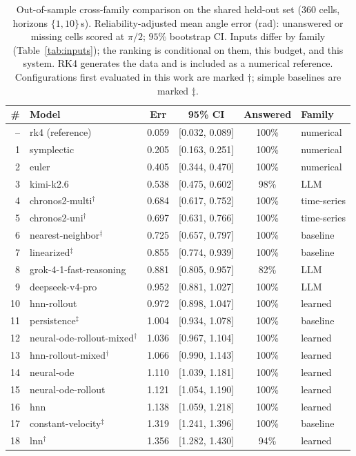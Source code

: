 \documentclass{article}
\begin{document}
\begin{table}[tbp]
\centering\footnotesize\renewcommand{\arraystretch}{0.82}
\caption{Out-of-sample cross-family comparison on the shared held-out set ($360$ cells, horizons
$\{1,10\}$\,s). Reliability-adjusted mean angle error (rad): unanswered or missing cells
scored at $\pi/2$; $95\%$ bootstrap CI. Inputs differ by family (Table~\ref{tab:inputs}); the
ranking is conditional on them, this budget, and this system. RK4 generates the data and is
included as a numerical reference. Configurations first evaluated in this work are marked $\dagger$;
simple baselines are marked $\ddagger$.}\label{tab:overall}
\begin{tabular}{rlcccl}
\toprule
\# & Model & Err & 95\% CI & Answered & Family \\
\midrule
-- & rk4 (reference) & 0.059 & [0.032, 0.089] & 100\% & numerical \\
1 & symplectic & 0.205 & [0.163, 0.251] & 100\% & numerical \\
2 & euler & 0.405 & [0.344, 0.470] & 100\% & numerical \\
3 & kimi-k2.6 & 0.538 & [0.475, 0.602] & 98\% & LLM \\
4 & chronos2-multi$^\dagger$ & 0.684 & [0.617, 0.752] & 100\% & time-series \\
5 & chronos2-uni$^\dagger$ & 0.697 & [0.631, 0.766] & 100\% & time-series \\
6 & nearest-neighbor$^\ddagger$ & 0.725 & [0.657, 0.797] & 100\% & baseline \\
7 & linearized$^\ddagger$ & 0.855 & [0.774, 0.939] & 100\% & baseline \\
8 & grok-4-1-fast-reasoning & 0.881 & [0.805, 0.957] & 82\% & LLM \\
9 & deepseek-v4-pro & 0.952 & [0.881, 1.027] & 100\% & LLM \\
10 & hnn-rollout & 0.972 & [0.898, 1.047] & 100\% & learned \\
11 & persistence$^\ddagger$ & 1.004 & [0.934, 1.078] & 100\% & baseline \\
12 & neural-ode-rollout-mixed$^\dagger$ & 1.036 & [0.967, 1.104] & 100\% & learned \\
13 & hnn-rollout-mixed$^\dagger$ & 1.066 & [0.990, 1.143] & 100\% & learned \\
14 & neural-ode & 1.110 & [1.039, 1.181] & 100\% & learned \\
15 & neural-ode-rollout & 1.121 & [1.054, 1.190] & 100\% & learned \\
16 & hnn & 1.138 & [1.059, 1.218] & 100\% & learned \\
17 & constant-velocity$^\ddagger$ & 1.319 & [1.241, 1.396] & 100\% & baseline \\
18 & lnn$^\dagger$ & 1.356 & [1.282, 1.430] & 94\% & learned \\
\bottomrule
\end{tabular}
\end{table}
\end{document}
